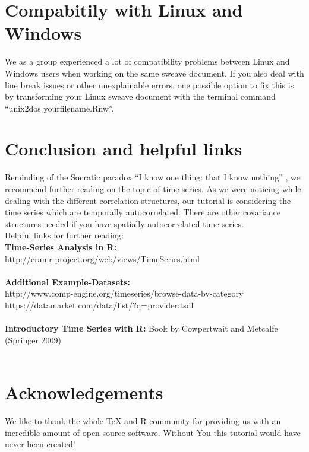 \documentclass[10pt, a4paper]{article} %
\begin{document}
\section{Compabitily with Linux and Windows}
\noindent We as a group experienced a lot of compatibility problems between Linux and Windows users when working on the same sweave document. If you also deal with line break issues or other unexplainable errors, one possible option to fix this is by transforming your Linux sweave document with the terminal command \enquote{unix2dos yourfilename.Rnw}.



\pagebreak
\section{Conclusion and helpful links}

Reminding of the Socratic paradox \enquote{I know one thing: that I know nothing} , we recommend further reading on the topic of time series. As we were noticing while dealing with the different correlation structures, our tutorial is considering the time series which are temporally autocorrelated. There are other covariance structures needed if you have spatially autocorrelated time series. \\

Helpful links for further reading: \\

\textbf{Time-Series Analysis in R:}
\\
http://cran.r-project.org/web/views/TimeSeries.html\\
\\
\textbf{Additional Example-Datasets:}
\\
http://www.comp-engine.org/timeseries/browse-data-by-category\\
https://datamarket.com/data/list/?q=provider:tsdl\\
\\
\textbf{Introductory Time Series with R:} Book by Cowpertwait and Metcalfe (Springer 2009)\\
\\

\section{Acknowledgements}%
We like to thank the whole TeX and R community for providing us with an incredible amount of open source software. Without You this tutorial would have never been created!
\end{document}

